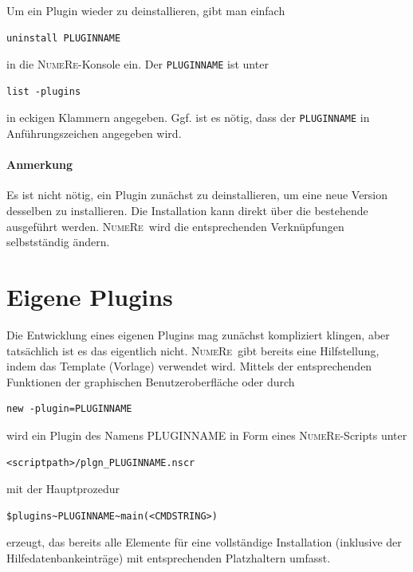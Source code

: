 \documentclass[DIV=14,headsepline,footsepline]{scrbook}
\newcommand{\NR}{\textsc{Nu\-me\-Re}}
\begin{document}
				Um ein Plugin wieder zu deinstallieren, gibt man einfach
				\begin{lstlisting}
uninstall PLUGINNAME
				\end{lstlisting}
				in die \NR-Konsole ein. Der \verb+PLUGINNAME+ ist unter
				\begin{lstlisting}
list -plugins
				\end{lstlisting}
				in eckigen Klammern angegeben. Ggf. ist es nötig, dass der \verb+PLUGINNAME+ in Anführungszeichen angegeben wird.
				\paragraph{Anmerkung}
					Es ist nicht nötig, ein Plugin zunächst zu deinstallieren, um eine neue Version desselben zu installieren. Die Installation kann direkt über die bestehende ausgeführt werden. \NR\ wird die entsprechenden Verknüpfungen selbstständig ändern.
			\section{Eigene Plugins}
				Die Entwicklung eines eigenen Plugins mag zunächst kompliziert klingen, aber tatsächlich ist es das eigentlich nicht. \NR\ gibt bereits eine Hilfstellung, indem das Template (Vorlage) verwendet wird. Mittels der entsprechenden Funktionen der graphischen Benutzeroberfläche oder durch
				\begin{lstlisting}
new -plugin=PLUGINNAME
				\end{lstlisting}
				wird ein Plugin des Namens PLUGINNAME in Form eines \NR-Scripts unter
				\begin{lstlisting}
<scriptpath>/plgn_PLUGINNAME.nscr
				\end{lstlisting}
				mit der Hauptprozedur
				\begin{lstlisting}
$plugins~PLUGINNAME~main(<CMDSTRING>)
				\end{lstlisting}
				erzeugt, das bereits alle Elemente für eine vollständige Installation (inklusive der Hilfedatenbankeinträge) mit entsprechenden Platzhaltern umfasst.
				
\end{document}
